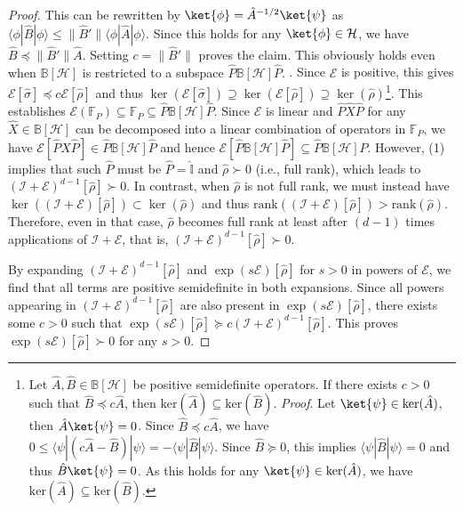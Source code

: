 \documentclass[preprint,pteplogo]{ptephy_v2}%
\numberwithin{equation}{section}
\theoremstyle{definition}
\newcommand{\mc}[1]{\mathcal{#1}}
\newcommand{\mbb}[1]{\mathbb{#1}}
\begin{document}
\begin{proof}
{This can be rewritten by $\ket{\phi} = \hat{A}^{-1/2} \ket{\psi}$ as $\langle \phi | \hat{B} | \phi \rangle \leq \| \hat{B}' \| \langle \phi | \hat{A} | \phi \rangle$. 
Since this holds for any $\ket{\phi} \in \mc{H}$, we have $\hat{B} \preceq \| \hat{B}' \| \hat{A}$. 
Setting $c=\| \hat{B}' \|$ proves the claim.
This obviously holds even when $\mbb{B}[\mc{H}]$ is restricted to a subspace $\hat{P} \mbb{B}[\mc{H}] \hat{P}$.
}. 
Since $\mc{E}$ is positive, this gives $\mc{E}[\hat{\sigma}] \preceq c \mc{E}[\hat{\rho}]$ and thus $\ker(\mc{E}[\hat{\sigma}]) \supseteq \ker(\mc{E}[\hat{\rho}]) \supseteq \ker(\hat{\rho})$\footnote{
Let $\hat{A}, \hat{B} \in \mbb{B}[\mc{H}]$ be positive semidefinite operators. 
If there exists $c>0$ such that $\hat{B} \preceq c \hat{A}$, then $\textrm{ker}(\hat{A}) \subseteq \textrm{ker}(\hat{B})$. 
\textit{Proof}. Let $\ket{\psi} \in \textrm{ker}(\hat{A})$, then $\hat{A} \ket{\psi}=0$. 
Since $\hat{B} \preceq c\hat{A}$, we have $0 \leq \langle \psi | (c\hat{A}-\hat{B}) | \psi \rangle = -\langle \psi | \hat{B} | \psi \rangle$.
Since $\hat{B} \succeq 0$, this implies $\langle \psi | \hat{B} | \psi \rangle = 0$ and thus $\hat{B} \ket{\psi} = 0$.
As this holds for any $\ket{\psi} \in \textrm{ker}(\hat{A})$, we have $\textrm{ker}(\hat{A}) \subseteq \textrm{ker}(\hat{B})$.
}. 
This establishes $\mc{E}(\mbb{F}_P) \subseteq \mbb{F}_P \subseteq \hat{P} \mbb{B}[\mc{H}] \hat{P}$. 
Since $\mc{E}$ is linear and $\hat{P} \hat{X} \hat{P}$ for any $\hat{X} \in \mbb{B}[\mc{H}]$ can be decomposed into a linear combination of operators in $\mbb{F}_P$, we have $\mc{E}[\hat{P} \hat{X} \hat{P}] \in \hat{P} \mbb{B}[\mc{H}] \hat{P}$ and hence $\mc{E}[\hat{P} \mbb{B}[\mc{H}] \hat{P}] \subseteq \hat{P} \mbb{B}[\mc{H}] \hat{P}$. 
However, (1) implies that such $\hat{P}$ must be $\hat{P} = \hat{\mbb{I}}$ and $\hat{\rho} \succ 0$ (i.e., full rank), which leads to $(\mc{I}+\mc{E})^{d-1}[\hat{\rho}] \succ 0$.
In contrast, when $\hat{\rho}$ is not full rank, we must instead have $\ker((\mc{I}+\mc{E})[\hat{\rho}]) \subset \ker(\hat{\rho})$ and thus $\textrm{rank}((\mc{I}+\mc{E})[\hat{\rho}]) > \textrm{rank}(\hat{\rho})$.
Therefore, even in that case, $\hat{\rho}$ becomes full rank at least after $(d-1)$ times applications of $\mc{I}+\mc{E}$, that is, $(\mc{I}+\mc{E})^{d-1}[\hat{\rho}] \succ 0$.

By expanding $(\mc{I}+\mc{E})^{d-1}[\hat{\rho}]$ and $\exp(s\mc{E})[\hat{\rho}]$ for $s>0$ in powers of $\mc{E}$, we find that all terms are positive semidefinite in both expansions.
Since all powers appearing in $(\mc{I}+\mc{E})^{d-1}[\hat{\rho}]$ are also present in $\exp(s\mc{E})[\hat{\rho}]$, there exists some $c>0$ such that $\exp(s\mc{E})[\hat{\rho}] \succeq c(\mc{I}+\mc{E})^{d-1}[\hat{\rho}]$.
This proves $\exp(s\mc{E})[\hat{\rho}] \succ 0$ for any $s>0$.


\end{proof}
\end{document}
